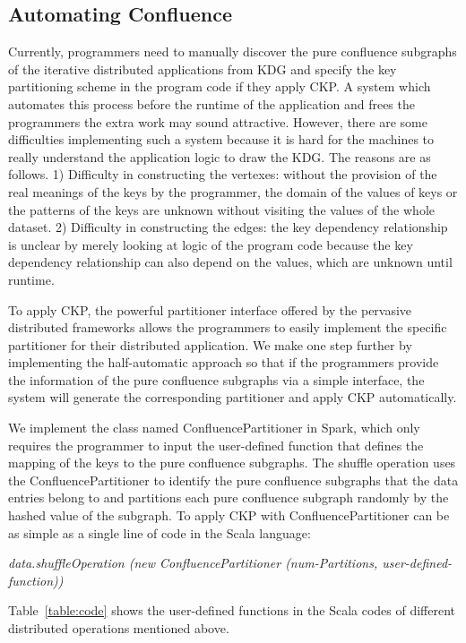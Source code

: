 \documentclass[10pt,journal,compsoc]{IEEEtran}
\begin{document}
\subsection{Automating Confluence}
Currently, programmers need to manually discover the pure confluence subgraphs of the iterative distributed applications from KDG and specify the key partitioning scheme in the program code if they apply CKP. 
A system which automates this process before the runtime of the application and frees the programmers the extra work may sound attractive. 
However, there are some difficulties implementing such a system because 
it is hard for the machines to really understand the application logic to draw the KDG. 
The reasons are as follows. 
1) Difficulty in constructing the vertexes: 
without the provision of the real meanings of the keys by the programmer, 
the domain of the values of keys or the patterns of the keys are unknown without visiting the values of the whole dataset. 
2) Difficulty in constructing the edges: 
the key dependency relationship is unclear by merely looking at logic of the program code because the key dependency relationship can also depend on the values, which are unknown until runtime. 

To apply CKP, the powerful partitioner interface offered by the pervasive distributed frameworks allows the programmers to easily implement the specific partitioner for their distributed application. 
We make one step further by implementing the half-automatic approach so that if the programmers provide the information of the pure confluence subgraphs via a simple interface, the system will generate the corresponding partitioner 
and apply CKP automatically. 

We implement the class named ConfluencePartitioner in Spark, 
which only requires the programmer to input the user-defined function that defines the mapping of the keys to the pure confluence subgraphs. 
The shuffle operation uses the ConfluencePartitioner to identify the pure confluence subgraphs that the data entries belong to 
and partitions each pure confluence subgraph randomly by the hashed value of the subgraph.  
To apply CKP with ConfluencePartitioner can be as simple as a single line of code
in the Scala language:

\textit{data.shuffleOperation (new ConfluencePartitioner (num-Partitions, user-defined-function))}

Table~\ref{table:code} shows the user-defined functions in the Scala codes of different distributed operations mentioned above. 
\end{document}
